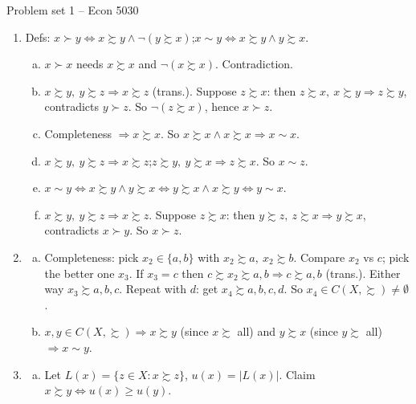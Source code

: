 \documentclass[12pt]{article}
\newcommand{\pref}{\succsim}
\newcommand{\C}{C(X,\pref)}
\begin{document}
\begin{center}
{\large Problem set 1 -- Econ 5030}
\end{center}

\begin{enumerate}

\item Defs: $x \succ y \iff x \pref y \wedge \neg(y \pref x)$;\quad $x \sim y \iff x \pref y \wedge y \pref x$.

\begin{enumerate}[(a)]
\item $x \succ x$ needs $x \pref x$ and $\neg(x \pref x)$. Contradiction.
\item $x \pref y,\ y \pref z \Rightarrow x \pref z$ (trans.). Suppose $z \pref x$: then $z \pref x,\ x \pref y \Rightarrow z \pref y$, contradicts $y \succ z$. So $\neg(z \pref x)$, hence $x \succ z$.
\item Completeness $\Rightarrow x \pref x$. So $x \pref x \wedge x \pref x \Rightarrow x \sim x$.
\item $x \pref y,\ y \pref z \Rightarrow x \pref z$;\quad $z \pref y,\ y \pref x \Rightarrow z \pref x$. So $x \sim z$.
\item $x \sim y \iff x \pref y \wedge y \pref x \iff y \pref x \wedge x \pref y \iff y \sim x$.
\item $x \pref y,\ y \pref z \Rightarrow x \pref z$. Suppose $z \pref x$: then $y \pref z,\ z \pref x \Rightarrow y \pref x$, contradicts $x \succ y$. So $x \succ z$.
\end{enumerate}

\item
\begin{enumerate}[(a)]
\item Completeness: pick $x_2 \in \{a,b\}$ with $x_2 \pref a,\ x_2 \pref b$. Compare $x_2$ vs $c$; pick the better one $x_3$. If $x_3 = c$ then $c \pref x_2 \pref a,b \Rightarrow c \pref a,b$ (trans.). Either way $x_3 \pref a,b,c$. Repeat with $d$: get $x_4 \pref a,b,c,d$. So $x_4 \in \C \ne \emptyset$.
\item $x,y \in \C \Rightarrow x \pref y$ (since $x \pref$ all) and $y \pref x$ (since $y \pref$ all) $\Rightarrow x \sim y$.
\end{enumerate}

\item
\begin{enumerate}[(a)]
\item Let $L(x) = \{z \in X : x \pref z\}$, $u(x) = |L(x)|$. Claim $x \pref y \iff u(x) \ge u(y)$.


\end{enumerate}
\end{enumerate}
\end{document}
